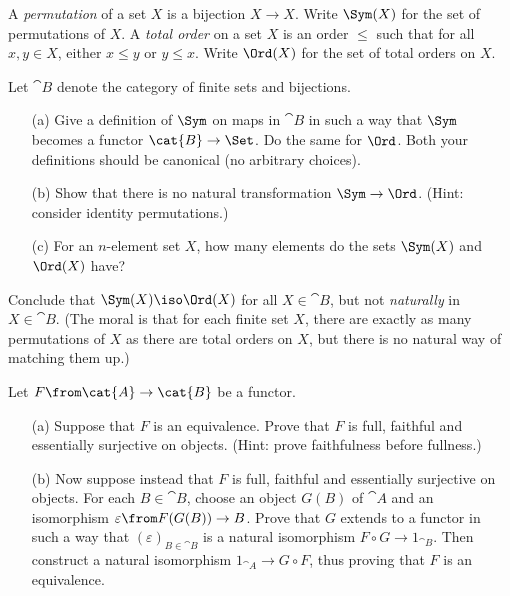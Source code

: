 \begin{exercise}
A \emph{permutation} of a set $X$ is a bijection $X \to X$.
Write $\Sym(X)$ for the set of permutations of $X$.
A \emph{total order} on a set $X$ is an order $\leq$ such that for all $x, y \in X$,
either $x \leq y$ or $y \leq x$.
Write $\Ord(X)$ for the set of total orders on $X$.

Let $\cat{B}$ denote the category of finite sets and bijections.

	\begin{itemize}
	\item[(a)]
Give a definition of $\Sym$ on maps in $\cat{B}$ in such a way that $\Sym$
becomes a functor $\cat{B} \to \Set$.  Do the same for $\Ord$.  Both your
definitions should be canonical (no arbitrary choices).

	\item[(b)]
Show that there is no natural transformation $\Sym \to \Ord$.
(Hint: consider identity permutations.)

	\item[(c)]
For an $n$-element set $X$, how many elements do the sets $\Sym(X)$
and $\Ord(X)$ have?
	\end{itemize}

Conclude that $\Sym(X) \iso \Ord(X)$ for all $X \in \cat{B}$, but not
\emph{naturally} in $X \in \cat{B}$.  (The moral is that for each finite
set $X$, there are exactly as many permutations of $X$ as there are total
orders on $X$, but there is no natural way of matching them up.)
\end{exercise}

\begin{exercise}
Let $F\from \cat{A} \to \cat{B}$ be a functor.

	\begin{itemize}
	\item[(a)]
Suppose that $F$ is an equivalence.  Prove that $F$ is full, faithful and
essentially surjective on objects.  (Hint: prove faithfulness before
fullness.)

	\item[(b)]
Now suppose instead that $F$ is full, faithful and essentially surjective
on objects.  For each $B \in \cat{B}$, choose an object $G(B)$ of $\cat{A}$
and an isomorphism $\varepsilon\from F(G(B)) \to B$.  Prove that $G$ extends
to a functor in such a way that $(\varepsilon)_{B \in \cat{B}}$ is a natural
isomorphism $F \circ G \to 1_{\cat{B}}$.  Then construct a natural isomorphism
$1_{\cat{A}} \to G \circ F$, thus proving that $F$ is an equivalence.
	\end{itemize}
\end{exercise}

